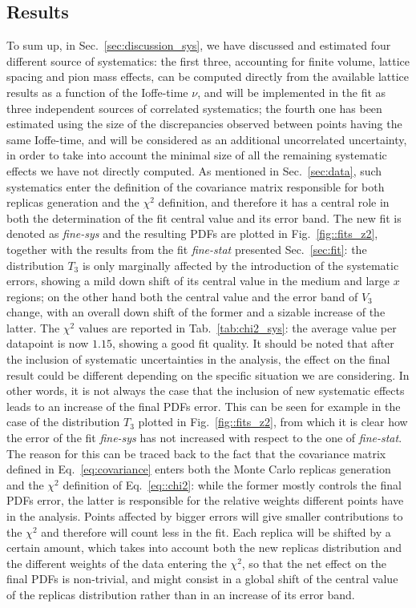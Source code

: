 \subsection{Results}
\label{sec:res}
%
To sum up, in Sec.~\ref{sec:discussion_sys}, we have discussed and estimated four different source of systematics: 
the first three, accounting for finite volume, lattice spacing and pion mass effects, can be computed directly from the available 
lattice results as a function of the Ioffe-time $\nu$, and will be implemented in the fit 
as three independent sources of correlated systematics; the fourth one has been estimated using
the size of the discrepancies observed between points having the same Ioffe-time, and will be considered
as an additional uncorrelated uncertainty, in order to take into account the minimal size of all the remaining systematic effects
we have not directly computed. 
%
As mentioned in Sec.~\ref{sec:data}, such systematics enter the definition of the covariance matrix responsible 
for both replicas generation and the $\chi^2$ definition, and therefore it has a central role in both
the determination of the fit central value and its error band.
The new fit is denoted as \textit{fine-sys} and the resulting PDFs are plotted in Fig.~\ref{fig::fits_z2}, 
together with the results from  the fit \textit{fine-stat} presented Sec.~\ref{sec:fit}:
the distribution $T_3$ is only marginally affected by the introduction of the systematic errors,
showing a mild down shift of its central value in the medium and large $x$ regions; on the other hand 
both the central value and the error band of $V_3$ change, with an overall down shift of the former and 
a sizable increase of the latter. 
The $\chi^2$ values are reported in Tab.~\ref{tab:chi2_sys}: the average value per datapoint is now $1.15$, 
showing a good fit quality.
%
It should be noted that after the inclusion of systematic uncertainties in the analysis, the effect
on the final result could be different depending on the specific situation we are considering.
In other words, it is not always the case that the inclusion of new systematic effects leads to an increase 
of the final PDFs error. This can be seen for example in the case of the distribution $T_3$ plotted in Fig.~\ref{fig::fits_z2},
from which it is clear how the error of the fit \textit{fine-sys} has not increased with respect to the one of
\textit{fine-stat}. The reason for this can be traced back to the fact that the covariance matrix 
defined in Eq.~\eqref{eq:covariance} enters both the Monte Carlo replicas generation and the $\chi^2$ definition
of Eq.~\eqref{eq::chi2}: while the former mostly controls the final PDFs error, 
the latter is responsible for the relative weights different points have in the analysis.
Points affected by bigger errors will give smaller contributions to the $\chi^2$ and therefore 
will count less in the fit. 
Each replica will be shifted by a certain amount, 
which takes into account both the new replicas distribution and the different weights of the data entering the
$\chi^2$, so that the net effect on the final PDFs is non-trivial, and might consist in a global shift
of the central value of the replicas distribution rather than in an increase of its error band.


